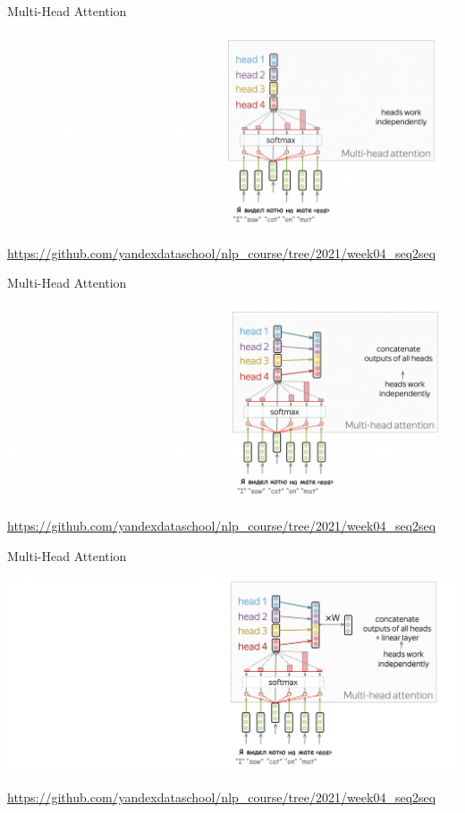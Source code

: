 \documentclass[notes,12pt, aspectratio=169]{beamer}
\begin{document}
\begin{frame}{Multi-Head Attention} 
	\begin{center}
		\includegraphics[width=.99\linewidth]{mh4.png}
	\end{center}
	\vfill
\footnotesize  {\color{blue} \url{https://github.com/yandexdataschool/nlp_course/tree/2021/week04_seq2seq}} 
\end{frame}


\begin{frame}{Multi-Head Attention} 
	\begin{center}
		\includegraphics[width=.99\linewidth]{mh5.png}
	\end{center}
	\vfill
\footnotesize  {\color{blue} \url{https://github.com/yandexdataschool/nlp_course/tree/2021/week04_seq2seq}} 
\end{frame}


\begin{frame}{Multi-Head Attention} 
	\begin{center}
		\includegraphics[width=.99\linewidth]{mh6.png}
	\end{center}
	\vfill
\footnotesize  {\color{blue} \url{https://github.com/yandexdataschool/nlp_course/tree/2021/week04_seq2seq}} 
\end{frame}
\end{document}
